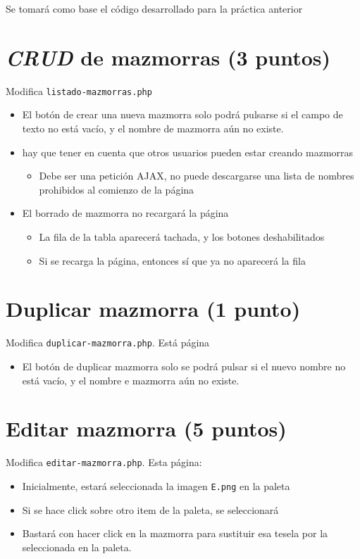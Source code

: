 \documentclass[a4paper]{article}
\begin{document}
Se tomará como base el código desarrollado para la práctica anterior

\section{\emph{CRUD} de mazmorras (3 puntos)}
\label{sec:org0000003}
Modifica \texttt{listado-mazmorras.php}
\begin{itemize}
\item El botón de crear una nueva mazmorra solo podrá pulsarse si el campo de texto no está vacío, y el nombre de mazmorra aún no existe.
\item hay que tener en cuenta que otros usuarios pueden estar creando mazmorras
\begin{itemize}
\item Debe ser una petición AJAX, no puede descargarse una lista de nombres prohibidos al comienzo de la página
\end{itemize}
\item El borrado de mazmorra no recargará la página
\begin{itemize}
\item La fila de la tabla aparecerá tachada, y los botones deshabilitados
\item Si se recarga la página, entonces sí que ya no aparecerá la fila
\end{itemize}
\end{itemize}

\section{Duplicar mazmorra (1 punto)}
\label{sec:org0000006}
Modifica \texttt{duplicar-mazmorra.php}. Está página
\begin{itemize}
\item El botón de duplicar mazmorra solo se podrá pulsar si el nuevo nombre no está vacío, y el nombre e mazmorra aún no existe.
\end{itemize}

\section{Editar mazmorra  (5 puntos)}
\label{sec:org0000009}
Modifica \texttt{editar-mazmorra.php}. Esta página:
\begin{itemize}
\item Inicialmente, estará seleccionada la imagen \texttt{E.png} en la paleta
\item Si se hace click sobre otro item de la paleta, se seleccionará
\item Bastará con hacer click en la mazmorra para sustituir esa tesela por la seleccionada en la paleta.
\end{itemize}
\end{document}
